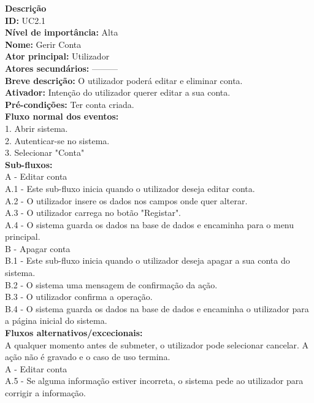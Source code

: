 \noindent \textbf{Descrição} \\
\textbf{ID:} UC2.1 \\  
\textbf{Nível de importância:} Alta \\
\textbf{Nome:} Gerir Conta \\
\textbf{Ator principal:} Utilizador \\
\textbf{Atores secundários:} --------- \\
\textbf{Breve descrição:} O utilizador poderá editar e eliminar conta. \\ 
\textbf{Ativador:} Intenção do utilizador querer editar a sua conta.  \\
\textbf{Pré-condições:} Ter conta criada. \\
\textbf{Fluxo normal dos eventos:} \\
1. Abrir sistema.  \\
2. Autenticar-se no sistema. \\
3. Selecionar "Conta" \\
\textbf{Sub-fluxos:} \\ 
\indent A - Editar conta\\
	\indent\indent A.1 - Este sub-fluxo inicia quando o utilizador deseja editar conta.\\
	\indent\indent A.2 - O utilizador insere os dados nos campos onde quer alterar.\\	
	\indent\indent A.3 - O utilizador carrega no botão "Registar".\\	
	\indent\indent A.4 - O sistema guarda os dados na base de dados e encaminha para o menu principal.\\	
	\indent B - Apagar conta \\ 
	\indent\indent B.1 - Este sub-fluxo inicia quando o utilizador deseja apagar a sua conta do sistema.\\
	\indent\indent B.2 - O sistema uma mensagem de confirmação da ação.\\
	\indent\indent B.3 - O utilizador confirma a operação.\\
	\indent\indent B.4 - O sistema guarda os dados na base de dados e encaminha o utilizador para a página inicial do sistema.\\
\textbf{Fluxos alternativos/excecionais:}  \\
	\indent A qualquer momento antes de submeter, o utilizador pode selecionar cancelar. A ação não é gravado e o caso de uso termina.\\
	\indent A - Editar conta\\
	\indent\indent A.5 - Se alguma informação estiver incorreta, o sistema pede ao utilizador para corrigir a informação.\\

